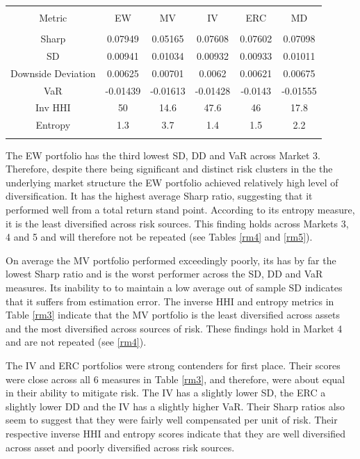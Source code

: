 \documentclass[11pt,preprint, authoryear]{elsarticle}
\let\origtable\table
\let\endorigtable\endtable
\renewenvironment{table}[1][2] {
    \expandafter\origtable\expandafter[H]
} {
    \endorigtable
}
\numberwithin{equation}{section}
\numberwithin{figure}{section}
\numberwithin{table}{section}
\begin{document}
\begin{table}[!htbp] \centering 
  \caption{Market 3 - Portfolio Risk Metrics} 
  \label{rm3} 
\begin{tabular}{@{\extracolsep{5pt}} cccccc} 
\\[-1.8ex]\hline 
\hline \\[-1.8ex] 
Metric & EW & MV & IV & ERC & MD \\ 
\hline \\[-1.8ex] 
Sharp & 0.07949 & 0.05165 & 0.07608 & 0.07602 & 0.07098 \\ 
SD & 0.00941 & 0.01034 & 0.00932 & 0.00933 & 0.01011 \\ 
Downside Deviation & 0.00625 & 0.00701 & 0.0062 & 0.00621 & 0.00675 \\ 
VaR & -0.01439 & -0.01613 & -0.01428 & -0.0143 & -0.01555 \\ 
Inv HHI & 50 & 14.6 & 47.6 & 46 & 17.8 \\ 
Entropy & 1.3 & 3.7 & 1.4 & 1.5 & 2.2 \\ 
\hline \\[-1.8ex] 
\end{tabular} 
\end{table}

The EW portfolio has the third lowest SD, DD and VaR across Market 3.
Therefore, despite there being significant and distinct risk clusters in
the the underlying market structure the EW portfolio achieved relatively
high level of diversification. It has the highest average Sharp ratio,
suggesting that it performed well from a total return stand point.
According to its entropy measure, it is the least diversified across
risk sources. This finding holds across Markets 3, 4 and 5 and will
therefore not be repeated (see Tables \ref{rm4} and \ref{rm5}).

On average the MV portfolio performed exceedingly poorly, its has by far
the lowest Sharp ratio and is the worst performer across the SD, DD and
VaR measures. Its inability to to maintain a low average out of sample
SD indicates that it suffers from estimation error. The inverse HHI and
entropy metrics in Table \ref{rm3} indicate that the MV portfolio is the
least diversified across assets and the most diversified across sources
of risk. These findings hold in Market 4 and are not repeated (see
\ref{rm4}).

The IV and ERC portfolios were strong contenders for first place. Their
scores were close across all 6 measures in Table \ref{rm3}, and
therefore, were about equal in their ability to mitigate risk. The IV
has a slightly lower SD, the ERC a slightly lower DD and the IV has a
slightly higher VaR. Their Sharp ratios also seem to suggest that they
were fairly well compensated per unit of risk. Their respective inverse
HHI and entropy scores indicate that they are well diversified across
asset and poorly diversified across risk sources.
\end{document}
